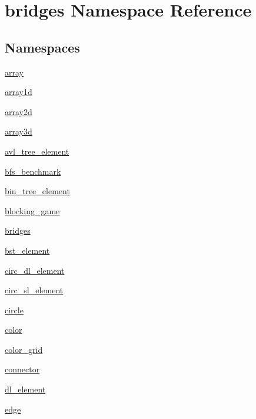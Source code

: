 \hypertarget{namespacebridges}{}\section{bridges Namespace Reference}
\label{namespacebridges}
\subsection*{Namespaces}
\begin{DoxyCompactItemize}
\item 
 \mbox{\hyperlink{namespacebridges_1_1array}{array}}
\item 
 \mbox{\hyperlink{namespacebridges_1_1array1d}{array1d}}
\item 
 \mbox{\hyperlink{namespacebridges_1_1array2d}{array2d}}
\item 
 \mbox{\hyperlink{namespacebridges_1_1array3d}{array3d}}
\item 
 \mbox{\hyperlink{namespacebridges_1_1avl__tree__element}{avl\+\_\+tree\+\_\+element}}
\item 
 \mbox{\hyperlink{namespacebridges_1_1bfs__benchmark}{bfs\+\_\+benchmark}}
\item 
 \mbox{\hyperlink{namespacebridges_1_1bin__tree__element}{bin\+\_\+tree\+\_\+element}}
\item 
 \mbox{\hyperlink{namespacebridges_1_1blocking__game}{blocking\+\_\+game}}
\item 
 \mbox{\hyperlink{namespacebridges_1_1bridges}{bridges}}
\item 
 \mbox{\hyperlink{namespacebridges_1_1bst__element}{bst\+\_\+element}}
\item 
 \mbox{\hyperlink{namespacebridges_1_1circ__dl__element}{circ\+\_\+dl\+\_\+element}}
\item 
 \mbox{\hyperlink{namespacebridges_1_1circ__sl__element}{circ\+\_\+sl\+\_\+element}}
\item 
 \mbox{\hyperlink{namespacebridges_1_1circle}{circle}}
\item 
 \mbox{\hyperlink{namespacebridges_1_1color}{color}}
\item 
 \mbox{\hyperlink{namespacebridges_1_1color__grid}{color\+\_\+grid}}
\item 
 \mbox{\hyperlink{namespacebridges_1_1connector}{connector}}
\item 
 \mbox{\hyperlink{namespacebridges_1_1dl__element}{dl\+\_\+element}}
\item 
 \mbox{\hyperlink{namespacebridges_1_1edge}{edge}}
\item 

\end{DoxyCompactItemize}
